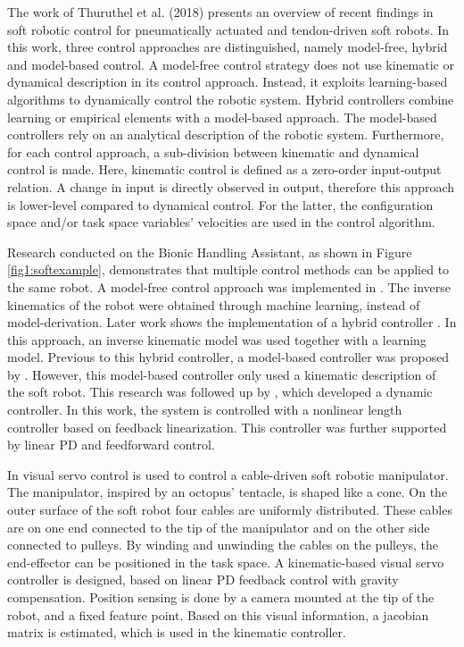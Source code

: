 The work of Thuruthel et al. (2018) \cite{george2018control} presents an overview of recent findings in soft robotic control for pneumatically actuated and tendon-driven soft robots. In this work, three control approaches are distinguished, namely model-free, hybrid and model-based control. A model-free control strategy does not use kinematic or dynamical description in its control approach. Instead, it exploits learning-based algorithms to dynamically control the robotic system. Hybrid controllers combine learning or empirical elements with a model-based approach. The model-based controllers rely on an analytical description of the robotic system. Furthermore, for each control approach, a sub-division between kinematic and dynamical control is made. Here, kinematic control is defined as a zero-order input-output relation. A change in input is directly observed in output, therefore this approach is lower-level compared to dynamical control. For the latter, the configuration space and/or task space variables' velocities are used in the control algorithm. 


Research conducted on the Bionic Handling Assistant, as shown in Figure \ref{fig1:softexample}, demonstrates that multiple control methods can be applied to the same robot. A model-free control approach was implemented in \cite{rolf2013efficient}. The inverse kinematics of the robot were obtained through machine learning, instead of model-derivation. Later work shows the implementation of a hybrid controller \cite{reinhart2017hybrid}. In this approach, an inverse kinematic model was used together with a learning model. Previous to this hybrid controller, a model-based controller was proposed by \cite{mahl2014bhakin}. However, this model-based controller only used a kinematic description of the soft robot. This research was followed up by \cite{falkenhahn2016dynamic}, which developed a dynamic controller. In this work, the system is controlled with a nonlinear length controller based on feedback linearization. This controller was further supported by linear PD and feedforward control. 

In \cite{wang2013visual} visual servo control is used to control a cable-driven soft robotic manipulator. The manipulator, inspired by an octopus' tentacle, is shaped like a cone. On the outer surface of the soft robot four cables are uniformly distributed. These cables are on one end connected to the tip of the manipulator and on the other side connected to pulleys. By winding and unwinding the cables on the pulleys, the end-effector can be positioned in the task space. A kinematic-based visual servo controller is designed, based on linear PD feedback control with gravity compensation. Position sensing is done by a camera mounted at the tip of the robot, and a fixed feature point. Based on this visual information, a jacobian matrix is estimated, which is used in the kinematic controller.

